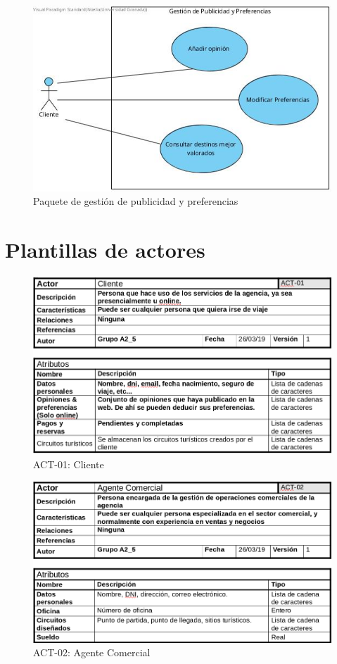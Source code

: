 \documentclass{article}
\begin{document}
	\begin{figure}[H]
		\centering
		\includegraphics[totalheight=5cm]{GestionDePublicidadYPreferencias}
		\caption{Paquete de gestión de publicidad y preferencias}
		\label{fig:gestion_publicidad_preferencias}
	\end{figure}

	\section{Plantillas de actores}
	\begin{figure}[H]
		\centering
		\includegraphics[totalheight=7.5cm]{act-1}
		\caption{ACT-01: Cliente}
		\label{fig:act-1}
	\end{figure}
	
	\begin{figure}[H]
		\centering
		\includegraphics[totalheight=7cm]{act-2}
		\caption{ACT-02: Agente Comercial}
		\label{fig:act-2}
	\end{figure}
\end{document}

